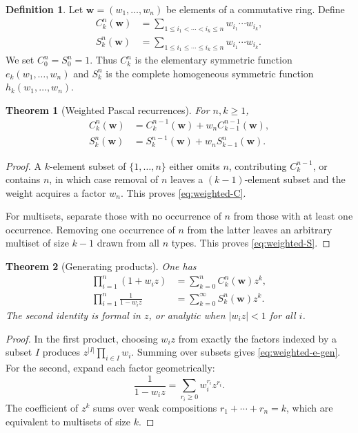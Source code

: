 \documentclass[11pt,oneside,openany]{book}
\newtheorem{theorem}{Theorem}[chapter]
\theoremstyle{definition}
\newtheorem{definition}[definition]{Definition}
\theoremstyle{remark}
\newcommand{\abs}[1]{\lvert #1\rvert}
\begin{document}
\begin{definition}
Let $\mathbf w=(w_1,\dots,w_n)$ be elements of a commutative ring.  Define
\begin{align*}
 C_k^n(\mathbf w)
 &=\sum_{1\le i_1<\cdots<i_k\le n}w_{i_1}\cdots w_{i_k},\\
 S_k^n(\mathbf w)
 &=\sum_{1\le i_1\le\cdots\le i_k\le n}w_{i_1}\cdots w_{i_k}.
\end{align*}
We set $C_0^n=S_0^n=1$.  Thus $C_k^n$ is the elementary symmetric function $e_k(w_1,\dots,w_n)$ and $S_k^n$ is the complete homogeneous symmetric function $h_k(w_1,\dots,w_n)$.
\end{definition}

\begin{theorem}[Weighted Pascal recurrences]\label{thm:weighted-pascal}
For $n,k\ge1$,
\begin{align}
 C_k^n(\mathbf w)&=C_k^{n-1}(\mathbf w)+w_nC_{k-1}^{n-1}(\mathbf w),\label{eq:weighted-C}\\
 S_k^n(\mathbf w)&=S_k^{n-1}(\mathbf w)+w_nS_{k-1}^{n}(\mathbf w).\label{eq:weighted-S}
\end{align}
\end{theorem}

\begin{proof}
A $k$-element subset of $\{1,\dots,n\}$ either omits $n$, contributing $C_k^{n-1}$, or contains $n$, in which case removal of $n$ leaves a $(k-1)$-element subset and the weight acquires a factor $w_n$.  This proves \eqref{eq:weighted-C}.

For multisets, separate those with no occurrence of $n$ from those with at least one occurrence.  Removing one occurrence of $n$ from the latter leaves an arbitrary multiset of size $k-1$ drawn from all $n$ types.  This proves \eqref{eq:weighted-S}.
\end{proof}

\begin{theorem}[Generating products]\label{thm:weighted-generating}
One has
\begin{align}
 \prod_{i=1}^{n}(1+w_i z)
 &=\sum_{k=0}^{n}C_k^n(\mathbf w)z^k,\label{eq:weighted-e-gen}\\
 \prod_{i=1}^{n}\frac1{1-w_i z}
 &=\sum_{k=0}^{\infty}S_k^n(\mathbf w)z^k.\label{eq:weighted-h-gen}
\end{align}
The second identity is formal in $z$, or analytic when $\abs{w_i z}<1$ for all $i$.
\end{theorem}

\begin{proof}
In the first product, choosing $w_i z$ from exactly the factors indexed by a subset $I$ produces $z^{\abs I}\prod_{i\in I}w_i$.  Summing over subsets gives \eqref{eq:weighted-e-gen}.  For the second, expand each factor geometrically:
\[
 \frac1{1-w_i z}=\sum_{r_i\ge0}w_i^{r_i}z^{r_i}.
\]
The coefficient of $z^k$ sums over weak compositions $r_1+\cdots+r_n=k$, which are equivalent to multisets of size $k$.
\end{proof}
\end{document}
